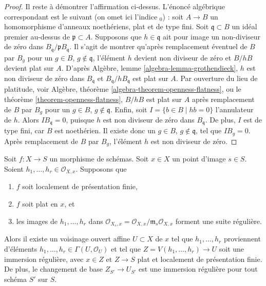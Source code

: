 \begin{proof}
\medskip\noindent
Il reste à démontrer l'affirmation ci-dessus. L'énoncé algébrique correspondant
est le suivant (on omet ici l'indice ${}_0$) :
soit $A \to B$ un homomorphisme d'anneaux noethériens, plat et de type fini.
Soit $\mathfrak q \subset B$ un idéal premier au-dessus de $\mathfrak p \subset A$.
Supposons que $h \in \mathfrak q$ ait pour image un non-diviseur de zéro dans
$B_{\mathfrak q}/\mathfrak p B_{\mathfrak q}$.
Il s'agit de montrer qu'après remplacement éventuel de $B$ par $B_g$ pour un
$g \in B$, $g \not \in \mathfrak q$, l'élément $h$ devient non diviseur de zéro
et $B/hB$ devient plat sur $A$. D'après
Algèbre, lemme \ref{algebra-lemma-grothendieck},
$h$ est non diviseur de zéro dans $B_{\mathfrak q}$ et
$B_{\mathfrak q}/hB_{\mathfrak q}$ est plat sur $A$.
Par ouverture du lieu de platitude, voir
Algèbre, théorème \ref{algebra-theorem-openness-flatness},
ou le
théorème \ref{theorem-openness-flatness},
$B/hB$ est plat sur $A$ après remplacement de $B$ par $B_g$ pour un
$g \in B$, $g \not \in \mathfrak q$. Enfin, soit
$I = \{b \in B \mid hb = 0\}$ l'annulateur de $h$. Alors
$IB_{\mathfrak q} = 0$, puisque $h$ est non diviseur de zéro dans $B_{\mathfrak q}$.
De plus, $I$ est de type fini, car $B$ est noethérien.
Il existe donc un $g \in B$, $g \not \in \mathfrak q$, tel que $IB_g = 0$.
Après remplacement de $B$ par $B_g$, l'élément $h$ est non diviseur de zéro.
\end{proof}

\begin{lemma}
\label{lemma-slice-given-elements}
Soit $f : X \to S$ un morphisme de schémas.
Soit $x \in X$ un point d'image $s \in S$.
Soient $h_1, \ldots, h_r \in \mathcal{O}_{X, x}$.
Supposons que
\begin{enumerate}
\item $f$ soit localement de présentation finie,
\item $f$ soit plat en $x$, et
\item les images de $h_1, \ldots, h_r$ dans
$\mathcal{O}_{X_s, x} = \mathcal{O}_{X, x}/\mathfrak m_s\mathcal{O}_{X, x}$
forment une suite régulière.
\end{enumerate}
Alors il existe un voisinage ouvert affine $U \subset X$ de $x$
tel que $h_1, \ldots, h_r$ proviennent d'éléments
$h_1, \ldots, h_r \in \Gamma(U, \mathcal{O}_U)$ et
tel que $Z = V(h_1, \ldots, h_r) \to U$ soit une immersion régulière, avec
$x \in Z$ et $Z \to S$ plat et localement de présentation finie.
De plus, le changement de base $Z_{S'} \to U_{S'}$ est une immersion régulière
pour tout schéma $S'$ sur $S$.
\end{lemma}

